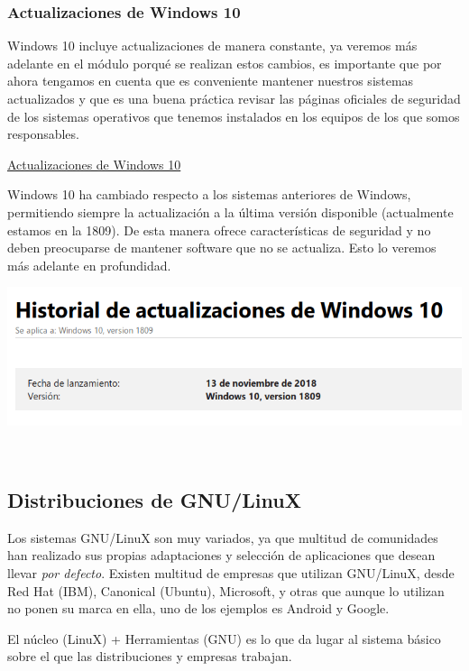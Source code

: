 \documentclass[11pt]{article}
\begin{document}
\subsubsection{Actualizaciones de Windows 10}
\label{sec:orgec65644}
Windows 10 incluye actualizaciones de manera constante, ya veremos más
adelante en el módulo porqué se realizan estos cambios, es importante
que por ahora tengamos en cuenta que es conveniente mantener nuestros
sistemas actualizados y que es una buena práctica revisar las páginas
oficiales de seguridad de los sistemas operativos que tenemos instalados
en los equipos de los que somos responsables.

\href{https://support.microsoft.com/es-es/help/4464619/windows-10-update-history}{Actualizaciones
de Windows 10}

Windows 10 ha cambiado respecto a los sistemas anteriores de Windows,
permitiendo siempre la actualización a la última versión disponible
(actualmente estamos en la 1809). De esta manera ofrece características
de seguridad y no deben preocuparse de mantener software que no se
actualiza. Esto lo veremos más adelante en profundidad.

\begin{center}
\includegraphics[width=.9\linewidth]{Versiones/windows10-1809.png}
\end{center}  

\subsection{Distribuciones de GNU/LinuX}
\label{sec:orge2f5a49}
Los sistemas GNU/LinuX son muy variados, ya que multitud de comunidades
han realizado sus propias adaptaciones y selección de aplicaciones que
desean llevar \emph{por defecto}. Existen multitud de empresas que utilizan
GNU/LinuX, desde Red Hat (IBM), Canonical (Ubuntu), Microsoft, y otras
que aunque lo utilizan no ponen su marca en ella, uno de los ejemplos es
Android y Google.

El núcleo (LinuX) + Herramientas (GNU) es lo que da lugar al sistema
básico sobre el que las distribuciones y empresas trabajan.
\end{document}
